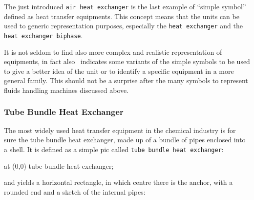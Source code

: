 \documentclass[12pt]{article}						%
\newcommand*{\ac}[1]{%
		\textsmaller{#1}%
	}
\newcommand*{\chpn}[1]{\texttt{#1}}				%
\newcommand*{\chpp}[1]{\texttt{#1}}				%
\newcommand*{\UNICHIM}{\ac{UNICHIM}}
\begin{document}
The just introduced \chpp{air heat exchanger} is the last example of ``simple
symbol'' defined as heat transfer equipments. This concept means that the
units can be used to generic representation purposes, especially the
\chpp{heat exchanger} and the \chpp{heat exchanger biphase}.

It is not seldom to find also more complex and realistic representation of
equipments, in fact also \UNICHIM\ indicates some variants of the simple symbols
to be used to give a better idea of the unit or to identify a specific equipment
in a more general family. This should not be a surprise after the many symbols to
represent fluids handling machines discussed above.

\subsubsection{Tube Bundle Heat Exchanger}

The most widely used heat transfer equipment in the chemical industry is for
sure the tube bundle heat exchanger, made up of a bundle of pipes enclosed into
a shell. It is defined as a simple pic called \chpp{tube bundle heat exchanger}:
\begin{chpcode}
	\pic at (0,0) {tube bundle heat exchanger};
\end{chpcode}
and yields a horizontal rectangle, in which centre there is the anchor, with a
rounded end and a sketch of the internal pipes:
\begin{center}
\end{center}
\end{document}
